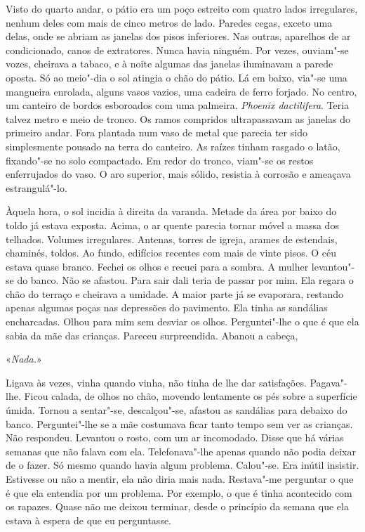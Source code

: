 Visto do quarto andar, o pátio era um poço estreito com quatro lados
irregulares, nenhum deles com mais de cinco metros de lado. Paredes
cegas, exceto uma delas, onde se abriam as janelas dos pisos
inferiores. Nas outras, aparelhos de ar condicionado, canos de
extratores. Nunca havia ninguém. Por vezes, ouviam"-se vozes, cheirava
a tabaco, e à noite algumas das janelas iluminavam a parede oposta. Só
ao meio"-dia o sol atingia o chão do pátio. Lá em baixo, via"-se uma
mangueira enrolada, alguns vasos vazios, uma cadeira de ferro forjado.
No centro, um canteiro de bordos esboroados com uma palmeira.
\emph{Phoenix dactilifera}. Teria talvez metro e meio de tronco. Os
ramos compridos ultrapassavam as janelas do primeiro andar. Fora
plantada num vaso de metal que parecia ter sido simplesmente pousado na
terra do canteiro. As raízes tinham rasgado o latão, fixando"-se no solo
compactado. Em redor do tronco, viam"-se os restos enferrujados do vaso.
O aro superior, mais sólido, resistia à corrosão e ameaçava
estrangulá"-lo.

Àquela hora, o sol incidia à direita da varanda. Metade da área por
baixo do toldo já estava exposta. Acima, o ar quente parecia tornar
móvel a massa dos telhados. Volumes irregulares. Antenas, torres de
igreja, arames de estendais, chaminés, toldos. Ao fundo, edifícios
recentes com mais de vinte pisos. O céu estava quase branco. Fechei os
olhos e recuei para a sombra. A mulher levantou"-se do banco. Não se
afastou. Para sair dali teria de passar por mim. Ela regara o chão do
terraço e cheirava a umidade. A maior parte já se evaporara, restando
apenas algumas poças nas depressões do pavimento. Ela tinha as sandálias
encharcadas. Olhou para mim sem desviar os olhos. Perguntei"-lhe o que é
que ela sabia da mãe das crianças. Pareceu surpreendida. Abanou a
cabeça,

«\emph{Nada.}»

Ligava às vezes, vinha quando vinha, não tinha de lhe dar satisfações.
Pagava"-lhe. Ficou calada, de olhos no chão, movendo lentamente os pés
sobre a superfície úmida. Tornou a sentar"-se, descalçou"-se, afastou
as sandálias para debaixo do banco. Perguntei"-lhe se a mãe costumava
ficar tanto tempo sem ver as crianças. Não respondeu. Levantou o rosto,
com um ar incomodado. Disse que há várias semanas que não falava com
ela. Telefonava"-lhe apenas quando não podia deixar de o fazer. Só mesmo
quando havia algum problema. Calou"-se. Era inútil insistir. Estivesse
ou não a mentir, ela não diria mais nada. Restava"-me perguntar o que é
que ela entendia por um problema. Por exemplo, o que é tinha acontecido
com os rapazes. Quase não me deixou terminar, desde o princípio da
semana que ela estava à espera de que eu perguntasse.

